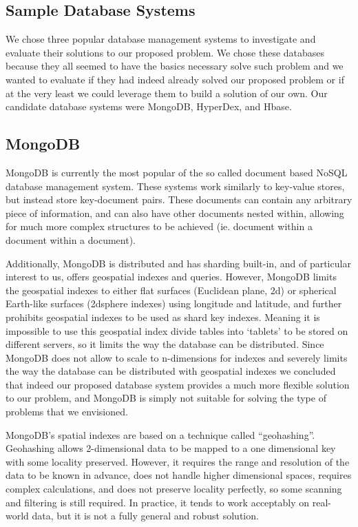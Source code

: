 \documentclass[11pt]{article}
\begin{document}
\subsection{Sample Database Systems}

We chose three popular database management systems to investigate and evaluate their solutions to our proposed problem. We chose these databases because they all seemed to have the basics necessary solve such problem and we wanted to evaluate if they had indeed already solved our proposed problem or if at the very least we could leverage them to build a solution of our own. Our candidate database systems were MongoDB, HyperDex, and Hbase.

\subsection{MongoDB}

MongoDB is currently the most popular of the so called document based NoSQL database management system. These systems work similarly to key-value stores, but instead store key-document pairs. These documents can contain any arbitrary piece of information, and can also have other documents nested within, allowing for much more complex structures to be achieved (ie. document within a document within a document). 

Additionally, MongoDB is distributed and has sharding built-in, and of particular interest to us, offers geospatial indexes and queries. However, MongoDB limits the geospatial indexes to either flat surfaces (Euclidean plane, 2d) or spherical Earth-like surfaces (2dsphere indexes) using longitude and latitude, and further prohibits geospatial indexes to be used as shard key indexes. Meaning it is impossible to use this geospatial index divide tables into `tablets' to be stored on different servers, so it limits the way the database can be distributed. Since MongoDB does not allow to scale to n-dimensions for indexes and severely limits the way the database can be distributed with geospatial indexes we concluded that indeed our proposed database system provides a much more flexible solution to our problem, and MongoDB is simply not suitable for solving the type of problems that we envisioned.

MongoDB's spatial indexes are based on a technique called ``geohashing''.  Geohashing allows 2-dimensional data to be mapped to a one dimensional key with some locality preserved.  However, it requires the range and resolution of the data to be known in advance, does not handle higher dimensional spaces, requires complex calculations, and does not preserve locality perfectly, so some scanning and filtering is still required.  In practice, it tends to work acceptably on real-world data, but it is not a fully general and robust solution.
\end{document}
